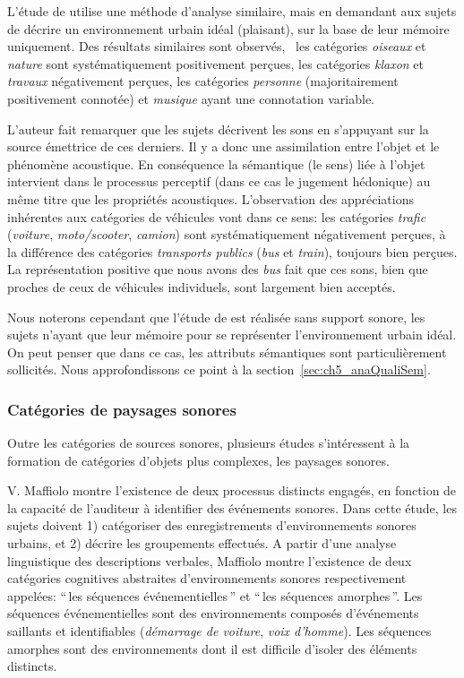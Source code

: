 L'étude de \citep{guastavino2006ideal} utilise une méthode d'analyse similaire, mais en demandant aux sujets de décrire un environnement urbain idéal (plaisant), sur la base de leur mémoire uniquement. Des résultats similaires sont observés, \ie~les catégories \emph{oiseaux} et \emph{nature} sont systématiquement positivement perçues, les catégories \emph{klaxon} et \emph{travaux} négativement perçues, les catégories \emph{personne} (majoritairement positivement connotée) et \emph{musique} ayant une connotation variable.

L'auteur fait remarquer que les sujets décrivent les sons en s'appuyant sur la source émettrice de ces derniers. Il y a donc une assimilation entre l'objet et le phénomène acoustique. En conséquence la sémantique (le sens) liée à l'objet intervient dans le processus perceptif (dans ce cas le jugement hédonique) au même titre que les propriétés acoustiques. L'observation des appréciations inhérentes aux catégories de véhicules vont dans ce sens: les catégories \emph{trafic} (\emph{voiture}, \emph{moto/scooter}, \emph{camion}) sont systématiquement négativement perçues, à la différence des catégories \emph{transports publics} (\emph{bus} et \emph{train}), toujours bien perçues. La représentation positive que nous avons des \emph{bus} fait que ces sons, bien que proches de ceux de véhicules individuels, sont largement bien acceptés.  

Nous noterons cependant que l'étude de \citep{guastavino2006ideal} est réalisée sans support sonore, les sujets n'ayant que leur mémoire pour se représenter l'environnement urbain idéal. On peut penser que dans ce cas, les attributs sémantiques sont particulièrement sollicités. Nous approfondissons ce point à la section~\ref{sec:ch5_anaQualiSem}.  \\



\subsubsection{Catégories de paysages sonores}
\label{sec:ch3_catsoundscape}

Outre les catégories de sources sonores, plusieurs études s’intéressent à la formation de catégories d'objets plus complexes, les paysages sonores.

V. Maffiolo \citep{maffiolo_caracterisation_1999} montre l'existence de deux processus distincts engagés, en fonction de la capacité de l'auditeur à identifier des événements sonores. Dans cette étude, les sujets doivent 1) catégoriser des enregistrements d'environnements sonores urbains, et 2) décrire les groupements effectués. A partir d'une analyse linguistique des descriptions verbales, Maffiolo montre l'existence de deux catégories cognitives abstraites d'environnements sonores respectivement appelées: ``\,les séquences événementielles\,'' et ``\,les séquences amorphes\,''. Les séquences événementielles sont des environnements composés d'événements saillants et identifiables (\emph{démarrage de voiture}, \emph{voix d'homme}). Les séquences amorphes sont des environnements dont il est difficile d'isoler des éléments distincts.

